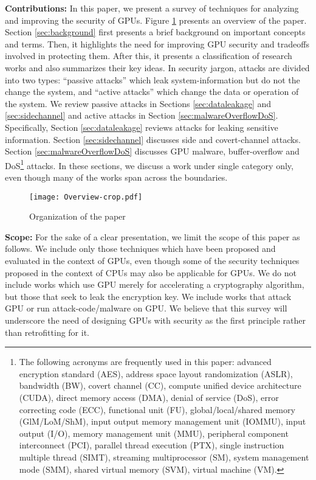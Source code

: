   
\textbf{Contributions:} In this paper, we present a survey of techniques for analyzing and improving the security of GPUs. Figure \ref{fig:overview} presents an overview of the paper. Section \ref{sec:background} first presents a brief background on important concepts and terms. Then, it highlights the need for improving GPU security and tradeoffs involved in protecting them.
After this, it presents a classification of research works and also summarizes their key ideas. In security jargon, attacks are divided into two types: ``passive attacks'' which leak system-information but do not the change the system, and ``active attacks'' which change the data or operation of the system. We review passive attacks in Sections \ref{sec:dataleakage} and \ref{sec:sidechannel} and active attacks in Section \ref{sec:malwareOverflowDoS}. Specifically, Section \ref{sec:dataleakage} reviews attacks for leaking sensitive information. Section \ref{sec:sidechannel} discusses side and covert-channel attacks. Section \ref{sec:malwareOverflowDoS} discusses GPU malware, buffer-overflow and DoS\footnote{The following acronyms are frequently used in this paper: advanced encryption standard (AES),  address space layout randomization (ASLR),  bandwidth (BW), covert channel (CC),  compute unified device architecture (CUDA), direct memory access (DMA), denial of service (DoS),   error correcting code (ECC),    functional unit (FU), global/local/shared memory (GlM/LoM/ShM), input output memory management unit (IOMMU), input output (I/O),   memory management unit (MMU),  peripheral component interconnect (PCI), parallel thread execution (PTX),  single instruction multiple thread (SIMT),  streaming multiprocessor (SM),  system management mode (SMM), shared virtual memory (SVM), virtual machine (VM).}  attacks. In these sections, we discuss a work under single category only, even though many of the works span across the boundaries. 

\begin{figure} [h]
\centering
\texttt{[image: Overview-crop.pdf]}
\caption{Organization of the paper }\label{fig:overview}
\end{figure}


\textbf{Scope:} For the sake of a clear presentation, we limit the scope of this paper as follows. We include only those techniques which have been proposed and evaluated in the context of GPUs, even though some of the security techniques proposed in the context of CPUs may also be applicable for GPUs. We do not include works which use GPU merely for accelerating a cryptography algorithm, but those that seek to leak the encryption key. We include works that attack GPU or run attack-code/malware on GPU. We believe that this survey will underscore the need of designing GPUs with security as the first principle rather than retrofitting for it.
 
 
 
